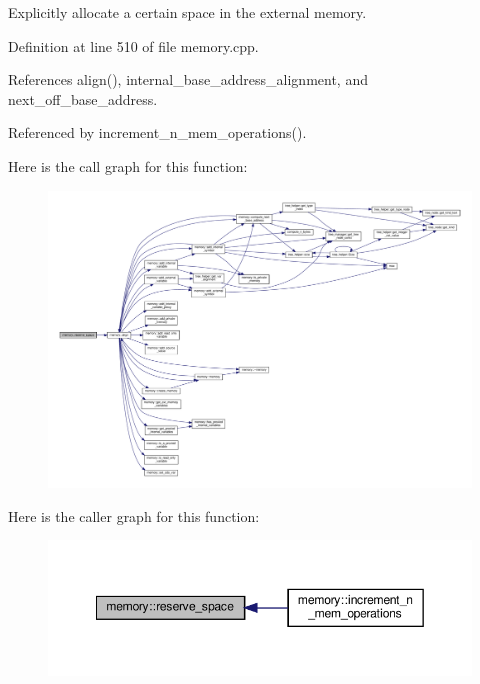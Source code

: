 Explicitly allocate a certain space in the external memory. 



Definition at line 510 of file memory.\+cpp.



References align(), internal\+\_\+base\+\_\+address\+\_\+alignment, and next\+\_\+off\+\_\+base\+\_\+address.



Referenced by increment\+\_\+n\+\_\+mem\+\_\+operations().

Here is the call graph for this function\+:
\nopagebreak
\begin{figure}[H]
\begin{center}
\leavevmode
\includegraphics[width=350pt]{d8/d99/classmemory_ae5cb10cded037f2d6b8171acb8cba6c9_cgraph}
\end{center}
\end{figure}
Here is the caller graph for this function\+:
\nopagebreak
\begin{figure}[H]
\begin{center}
\leavevmode
\includegraphics[width=349pt]{d8/d99/classmemory_ae5cb10cded037f2d6b8171acb8cba6c9_icgraph}
\end{center}
\end{figure}
\mbox{\label{classmemory_ab351898868e78407d9fc2ec1e4969c0c}} 
